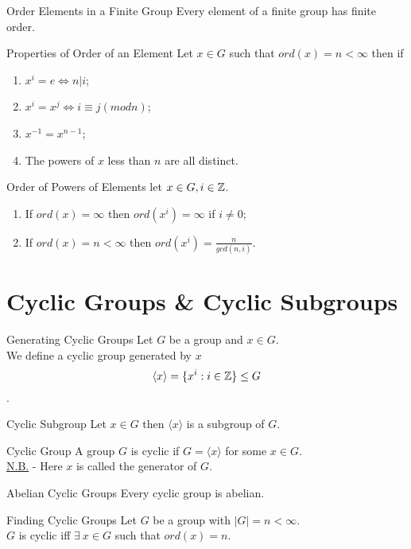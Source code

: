 \documentclass[11pt,a4paper]{article}
\begin{document}
\subtitle{Theorem 6.03 - }{Order Elements in a Finite Group}
Every element of a finite group has finite order.\\

\subtitle{Theorem 6.04 - }{Properties of Order of an Element}
Let $x \in G$ such that $ord(x) = n < \infty$ then if
\begin{enumerate}[label=\roman*)]
  \item $x^i = e \iff n | i$;
  \item $x^i = x^j \iff i \equiv j (mod n)$;
  \item $x^{-1} = x^{n-1}$;
  \item The powers of $x$ less than $n$ are all distinct.\\
\end{enumerate}

\subtitle{Proposition 6.05 - }{Order of Powers of Elements}
let $x \in G, i \in \mathbb{Z}$.
\begin{enumerate}[label=\roman*)]
  \item If $ord(x) = \infty$ then $ord(x^i) = \infty$ if $i \not = 0$;
  \item If $ord(x) = n < \infty$ then $\displaystyle{ord(x^i) = \frac{n}{gcd(n,i)}}$.
\end{enumerate}

\section{Cyclic Groups \& Cyclic Subgroups}

\subtitle{Definition 7.01 - }{Generating Cyclic Groups}
Let $G$ be a group and $x \in G$.\\
We define a cyclic group generated by $x$ $$\langle x \rangle = \{x^i : i \in \mathbb{Z} \} \leq G$$.

\subtitle{Theorem 7.02 - }{Cyclic Subgroup}
Let $x \in G$ then $\langle x \rangle$ is a subgroup of $G$.\\

\subtitle{Definition 7.03 - }{Cyclic Group}
A group $G$ is cyclic if $G = \langle x \rangle$ for some $x \in G$.\\
\underline{N.B.} - Here $x$ is called the generator of $G$.\\

\subtitle{Theorem 7.04 - }{Abelian Cyclic Groups}
Every cyclic group is abelian.\\

\subtitle{Theorem 7.05 - }{Finding Cyclic Groups}
Let $G$ be a group with $|G| = n < \infty$.\\
$G$ is cyclic iff $\exists\ x \in G$ such that $ord(x) = n$.\\
\end{document}
